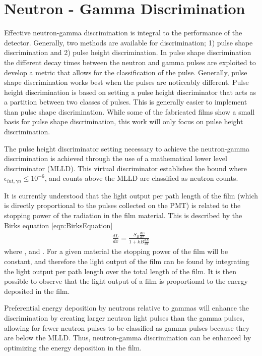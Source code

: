 \chapter{Neutron - Gamma Discrimination}
\label{chap:SecElectron}

Effective neutron-gamma discrimination is integral to the performance of the detector.
Generally, two methods are available for discrimination; 1) pulse shape discrimination and 2) pulse height discrimination.
In pulse shape discrimination the different decay times between the neutron and gamma pulses are exploited to develop a metric that allows for the classification of the pulse.
Generally, pulse shape discrimination works best when the pulses are noticeably different.
Pulse height discrimination is based on setting a pulse height discriminator that acts as a partition between two classes of pulses.
This is generally easier to implement than pulse shape discrimination.
While some of the fabricated films show a small basis for pulse shape discrimination, this work will only focus on pulse height discrimination.

The pulse height discriminator setting necessary to achieve the neutron-gamma discrimination is achieved through the use of a mathematical lower level discriminator (MLLD).
This virtual discriminator establishes the bound where $\epsilon_{int,\gamma n}\leq 10^{-6}$, and counts above the MLLD are classified as neutron counts. 

It is currently understood that the light output per path length of the film (which is directly proportional to the pulses collected on the PMT) is related to the stopping power of the radiation in the film material.
This is described by the Birks equation \eqref{eqn:BirksEquation}
\begin{align}
  \label{eqn:BirksEquation}
  \frac{dL}{dx} = \frac{S_B\frac{dE}{dx}}{1+kB\frac{dE}{dx}}
\end{align}
where , and .
For a given material the stopping power of the film will be constant, and therefore the light output of the film can be found by integrating the light output per path length over the total length of the film.
It is then possible to observe that the light output of a film is proportional to the energy deposited in the film.

Preferential energy deposition by neutrons relative to gammas will enhance the discrimination by creating larger neutron light pulses than the gamma pulses, allowing for fewer neutron pulses to be classified as gamma pulses because they are below the MLLD.
Thus, neutron-gamma discrimination can be enhanced by optimizing the energy deposition in the film. 

